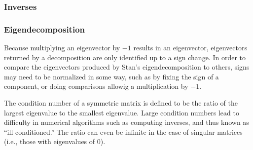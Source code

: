 \begin{description}
%
%
\end{description}

\subsubsection{Inverses}

\begin{description}
%
%
%
\end{description}

\subsubsection{Eigendecomposition}

\begin{description}
%
%
%
\end{description}
%
Because multiplying an eigenvector by $-1$ results in an eigenvector,
eigenvectors returned by a decomposition are only identified up to a
sign change.  In order to compare the eigenvectors produced by Stan's
eigendecomposition to others, signs may need to be normalized in some
way, such as by fixing the sign of a component, or doing comparisons
allowig a multiplication by $-1$.

The condition number of a symmetric matrix is defined to be the ratio
of the largest eigenvalue to the smallest eigenvalue.  Large condition
numbers lead to difficulty in numerical algorithms such as computing
inverses, and thus known as ``ill conditioned.''  The ratio can even
be infinite in the case of singular matrices (i.e., those with
eigenvalues of 0).

%
%
%

